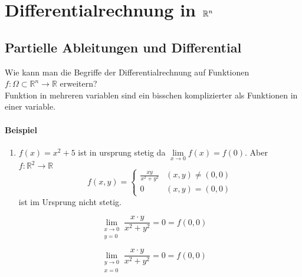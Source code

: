 \chapter{Differentialrechnung in $\mathbb{R}^{\lowercase{n}}$}
\section{Partielle Ableitungen und Differential}
Wie kann man die Begriffe der  Differentialrechnung auf Funktionen $f:\Omega \subset \mathbb{R}^n\rightarrow\mathbb{R}$ erweitern?\\

Funktion in mehreren variablen sind ein bisschen komplizierter als Funktionen in einer variable.
\subsubsection*{Beispiel}
\begin{enumerate}
\item $f(x)=x^2+5$ ist in ursprung stetig da $\lim\limits_{x\rightarrow 0}f(x)=f(0)$. Aber $f:\mathbb{R}^2\rightarrow\mathbb{R}$ \[f(x,y) = \left\{ {\begin{array}{*{20}{c}}
{\frac{{xy}}{{{x^2} + {y^2}}}}&{(x,y)\not  = (0,0)}\\
0&{(x,y) = (0,0)}
\end{array}} \right.\] ist im Ursprung nicht stetig. %
\end{enumerate}
\begin{figure}[ht]
\begin{minipage}[b]{0.45\linewidth}
\centering
\[\mathop {\lim }\limits_{\begin{array}{*{20}{c}}
{x \to 0}\\
{y = 0}
\end{array}} \frac{{x \cdot y}}{{{x^2} + {y^2}}} = 0 = f(0,0)\]
\end{minipage}
\hspace{0.5cm}
\begin{minipage}[b]{0.45\linewidth}
\centering
\[\mathop {\lim }\limits_{\begin{array}{*{20}{c}}
{y \to 0}\\
{x = 0}
\end{array}} \frac{{x \cdot y}}{{{x^2} + {y^2}}} = 0 = f(0,0)\]
\end{minipage}
\end{figure}

